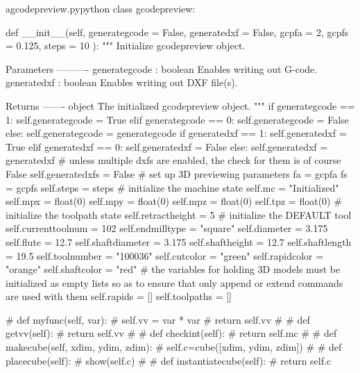 \documentclass{ltxdoc}
\begin{document}
\lstset{firstnumber=\thegcpy}
\begin{writecode}{a}{gcodepreview.py}{python}
class gcodepreview:

    def __init__(self, 
                 generategcode = False,
                 generatedxf = False,
                 gcpfa = 2,
                 gcpfs = 0.125,
                 steps = 10
                 ):
        """
        Initialize gcodepreview object.
    
        Parameters
        ----------
        generategcode : boolean
                        Enables writing out G-code.
        generatedxf   : boolean
                        Enables writing out DXF file(s).
        
        Returns
        -------
        object
            The initialized gcodepreview object.
        """
        if generategcode == 1:
            self.generategcode = True
        elif generategcode == 0:
            self.generategcode = False
        else:
            self.generategcode = generategcode
        if generatedxf == 1:
            self.generatedxf = True
        elif generatedxf == 0:
            self.generatedxf = False
        else:
            self.generatedxf = generatedxf
# unless multiple dxfs are enabled, the check for them is of course False
        self.generatedxfs = False
# set up 3D previewing parameters
        fa = gcpfa
        fs = gcpfs
        self.steps = steps
# initialize the machine state
        self.mc = "Initialized"
        self.mpx = float(0)
        self.mpy = float(0)
        self.mpz = float(0)
        self.tpz = float(0)
# initialize the toolpath state
        self.retractheight = 5
# initialize the DEFAULT tool
        self.currenttoolnum = 102
        self.endmilltype = "square"
        self.diameter = 3.175
        self.flute = 12.7
        self.shaftdiameter = 3.175
        self.shaftheight = 12.7
        self.shaftlength = 19.5
        self.toolnumber = "100036"
        self.cutcolor = "green"
        self.rapidcolor = "orange"
        self.shaftcolor = "red"
# the variables for holding 3D models must be initialized as empty lists so as to ensure that only append or extend commands are used with them
        self.rapids = []
        self.toolpaths = []

#    def myfunc(self, var):
#        self.vv = var * var
#        return self.vv
#
#    def getvv(self):
#        return self.vv
#        
#    def checkint(self):
#        return self.mc
#
#    def makecube(self, xdim, ydim, zdim):
#        self.c=cube([xdim, ydim, zdim])
#        
#    def placecube(self):
#        show(self.c)
#
#    def instantiatecube(self):
#        return self.c

\end{writecode}
\addtocounter{gcpy}{93}
\end{document}
